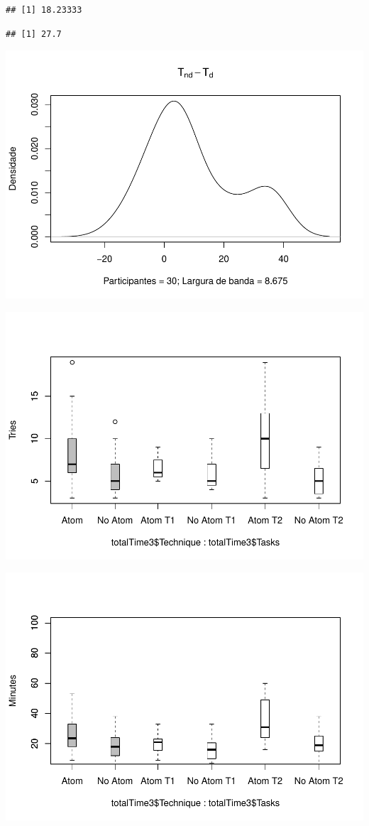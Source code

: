 \documentclass[]{article}
\begin{document}
\begin{verbatim}
## [1] 18.23333
\end{verbatim}

\begin{verbatim}
## [1] 27.7
\end{verbatim}

\includegraphics{main_files/figure-latex/unnamed-chunk-8-1.pdf}

\includegraphics{main_files/figure-latex/unnamed-chunk-9-1.pdf}

\includegraphics{main_files/figure-latex/unnamed-chunk-10-1.pdf}
\end{document}

